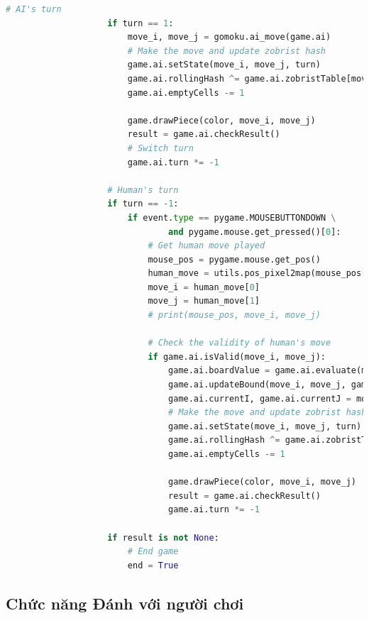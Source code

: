 \documentclass[a4paper]{article}
\begin{document}
\begin{lstlisting}[language=Python]
                    # AI's turn
                    if turn == 1:
                        move_i, move_j = gomoku.ai_move(game.ai)
                        # Make the move and update zobrist hash
                        game.ai.setState(move_i, move_j, turn)
                        game.ai.rollingHash ^= game.ai.zobristTable[move_i][move_j][0]
                        game.ai.emptyCells -= 1
        
                        game.drawPiece(color, move_i, move_j)
                        result = game.ai.checkResult()
                        # Switch turn
                        game.ai.turn *= -1
        
                    # Human's turn
                    if turn == -1:
                        if event.type == pygame.MOUSEBUTTONDOWN \
                                and pygame.mouse.get_pressed()[0]:
                            # Get human move played
                            mouse_pos = pygame.mouse.get_pos()
                            human_move = utils.pos_pixel2map(mouse_pos[0], mouse_pos[1])
                            move_i = human_move[0]
                            move_j = human_move[1]
                            # print(mouse_pos, move_i, move_j)
        
                            # Check the validity of human's move
                            if game.ai.isValid(move_i, move_j):
                                game.ai.boardValue = game.ai.evaluate(move_i, move_j, game.ai.boardValue, -1, game.ai.nextBound)
                                game.ai.updateBound(move_i, move_j, game.ai.nextBound)
                                game.ai.currentI, game.ai.currentJ = move_i, move_j
                                # Make the move and update zobrist hash
                                game.ai.setState(move_i, move_j, turn)
                                game.ai.rollingHash ^= game.ai.zobristTable[move_i][move_j][1]
                                game.ai.emptyCells -= 1
        
                                game.drawPiece(color, move_i, move_j)
                                result = game.ai.checkResult()
                                game.ai.turn *= -1
        
                    if result is not None:
                        # End game
                        end = True
    \end{lstlisting}
\subsection{Chức năng Đánh với người chơi}
\end{document}
